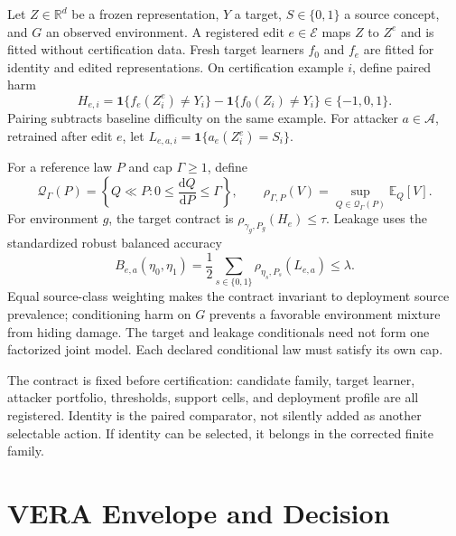 Let $Z\in\mathbb R^d$ be a frozen representation, $Y$ a target, $S\in\{0,1\}$
a source concept, and $G$ an observed environment. A registered edit
$e\in\mathcal E$ maps $Z$ to $Z^e$ and is fitted without certification data.
Fresh target learners $f_0$ and $f_e$ are fitted for identity and edited
representations. On certification example $i$, define paired harm
\begin{equation}
H_{e,i}=\mathbf 1\{f_e(Z_i^e)\ne Y_i\}-
\mathbf 1\{f_0(Z_i)\ne Y_i\}\in\{-1,0,1\}.
\label{iclr:eq:harm}
\end{equation}
Pairing subtracts baseline difficulty on the same example. For attacker
$a\in\mathcal A$, retrained after edit $e$, let
$L_{e,a,i}=\mathbf 1\{a_e(Z_i^e)=S_i\}$.

For a reference law $P$ and cap $\Gamma\ge1$, define
\begin{equation}
\mathcal Q_\Gamma(P)=\left\{Q\ll P:
0\le\frac{\mathrm dQ}{\mathrm dP}\le\Gamma\right\},\qquad
\rho_{\Gamma,P}(V)=\sup_{Q\in\mathcal Q_\Gamma(P)}\mathbb E_Q[V].
\label{iclr:eq:robust-risk}
\end{equation}
For environment $g$, the target contract is
$\rho_{\gamma_g,P_g}(H_e)\le\tau$. Leakage uses the standardized robust
balanced accuracy
\begin{equation}
B_{e,a}(\eta_0,\eta_1)=\frac12\sum_{s\in\{0,1\}}
\rho_{\eta_s,P_s}(L_{e,a})\le\lambda.
\label{iclr:eq:balanced}
\end{equation}
Equal source-class weighting makes the contract invariant to deployment source
prevalence; conditioning harm on $G$ prevents a favorable environment mixture
from hiding damage. The target and leakage conditionals need not form one
factorized joint model. Each declared conditional law must satisfy its own cap.

The contract is fixed before certification: candidate family, target learner,
attacker portfolio, thresholds, support cells, and deployment profile are all
registered. Identity is the paired comparator, not silently added as another
selectable action. If identity can be selected, it belongs in the corrected
finite family.

\section{VERA Envelope and Decision}
\label{iclr:sec:method}

